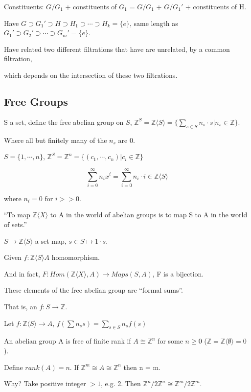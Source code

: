 \documentclass[12pt]{article}
\begin{document}
Constituents: $G/G_1$ + constituents of $G_1$ = $G/G_1$ + $G/G_1'$ + constituents of H.

Have $G \supset G_1' \supset H \supset H_1 \supset \cdots \supset H_k = \{e\}$, same length as $G_1' \supset G_2' \supset \cdots \supset G_m' = \{e\}$.

Have related two different filtrations that have are unrelated, by a common filtration,

which depends on the intersection of these two filtrations.

\subsection{Free Groups}

S a set, define the free abelian group on $S$, $\mathds{Z}^S = \mathds{Z}\langle S\rangle = \{\sum_{s \in S} n_s \cdot s | n_s \in \mathds{Z}\}$.

Where all but finitely many of the $n_s$ are 0.

$S = \{1, \cdots, n\}$, $\mathds{Z}^S = \mathds{Z}^n = \{(c_1, \cdots, c_n) | c_i \in \mathds{Z}\}$

$$\sum_{i = 0}^\infty n_i x^i = \sum_{i = 0}^\infty n_i \cdot i \in \mathds{Z}\langle S \rangle$$

where $n_i = 0$ for $i >> 0$.

\noindent
``To map $\mathds{Z}\langle X\rangle$ to A in the world of abelian groups is to map S to A in the world of sets.''

$S \to \mathds{Z}\langle S \rangle$ a set map, $s \in S \mapsto 1 \cdot s$.

Given $f: \mathds{Z} \langle S \rangle A$ homomorphism.

And in fact, $F: Hom(\mathds{Z} \langle X\rangle, A) \to Maps(S, A)$, F is a bijection.

\noindent
These elements of the free abelian group are ``formal sums''.

That is, an $f: S \to \mathds{Z}$.

\noindent
Let $f: \mathds{Z}\langle S\rangle \to A$, $f(\sum n_ss) = \sum_{s \in S}n_sf(s)$

\noindent
An abelian group A is free of finite rank if $A \cong \mathds{Z}^n$ for some $n \geq 0$ ($\mathds{Z} = \mathds{Z}\langle \emptyset \rangle = 0$).

Define $rank(A) = n$.  If $\mathds{Z}^m \cong A \cong \mathds{Z}^n$ then n = m.

Why? Take positive integer $> 1$, e.g. 2.  Then $\mathds{Z}^n/2\mathds{Z}^n \cong \mathds{Z}^m/2\mathds{Z}^m$.
\end{document}
